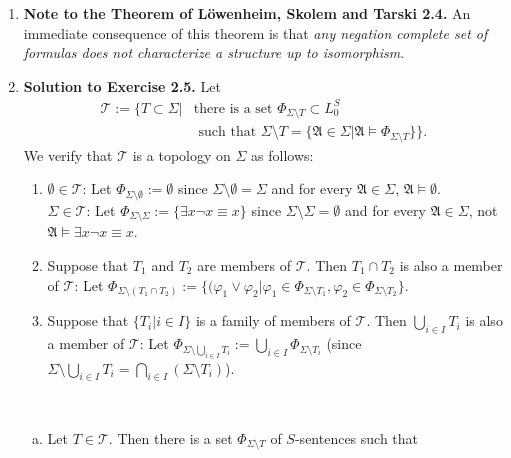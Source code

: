 \begin{enumerate}[1.]
\begin{proof}
If $\Phi$ were such a set, then by 2.2 it would have an \emph{infinite} model $\intp$, a contradiction.
\end{proof}
%
\item \textbf{Note to the Theorem of L\"{o}wenheim, Skolem and Tarski 2.4.} An immediate consequence of this theorem is that \emph{any negation complete set of formulas does not characterize a structure up to isomorphism}.
%
\item \textbf{Solution to Exercise 2.5.} Let
\[
\begin{array}{ll}
\mathcal{T} := \{T \subset \Sigma | &\mbox{there is a set $\Phi_{\Sigma \setminus T} \subset L_0^S$}\\
\  &\mbox{\ \ \ such that } \Sigma \setminus T = \{ \mathfrak{A} \in \Sigma | \mathfrak{A} \models \Phi_{\Sigma \setminus T} \} \}.
\end{array}
\]
We verify that $\mathcal{T}$ is a topology on $\Sigma$ as follows:
\begin{enumerate}[(1)]
\item $\emptyset \in \mathcal{T}$: Let $\Phi_{\Sigma \setminus \emptyset} := \emptyset$ since $\Sigma \setminus \emptyset = \Sigma$ and for every $\mathfrak{A} \in \Sigma$, $\mathfrak{A} \models \emptyset$.\\
$\Sigma \in \mathcal{T}$: Let $\Phi_{\Sigma \setminus \Sigma} := \{\exists x \neg x \equiv x \}$ since $\Sigma \setminus \Sigma = \emptyset$ and for every $\mathfrak{A} \in \Sigma$, not $\mathfrak{A} \models \exists x \neg x \equiv x$.
\item Suppose that $T_1$ and $T_2$ are members of $\mathcal{T}$. Then $T_1 \cap T_2$ is also a member of $\mathcal{T}$: Let $\Phi_{\Sigma \setminus (T_1 \cap T_2)} := \{ (\varphi_1 \lor \varphi_2 | \varphi_1 \in \Phi_{\Sigma \setminus T_1}, \varphi_2 \in \Phi_{\Sigma \setminus T_2} \}$.
\item Suppose that $\{ T_i | i \in I \}$ is a family of members of $\mathcal{T}$. Then $\bigcup_{i \in I} T_i$ is also a member of $\mathcal{T}$: Let $\Phi_{\Sigma \setminus \bigcup_{i \in I} T_i} := \bigcup_{i \in I} \Phi_{\Sigma \setminus T_i}$ (since $\Sigma \setminus \bigcup_{i \in I} T_i = \bigcap_{i \in I} (\Sigma \setminus T_i)$).
\end{enumerate}
\ 
\\
\begin{enumerate}[(a)]
\item Let $T \in \mathcal{T}$. Then there is a set $\Phi_{\Sigma \setminus T}$ of $S$-sentences such that

\end{enumerate}
\end{enumerate}
